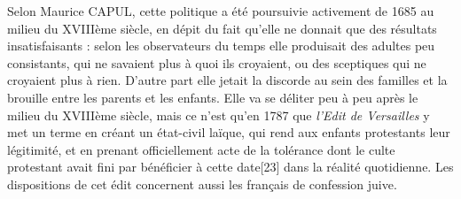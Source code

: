  Selon Maurice CAPUL, cette politique a été poursuivie activement de 1685 au milieu du XVIIIème siècle, en dépit du fait qu'elle ne donnait que des résultats insatisfaisants : selon les observateurs du temps elle produisait des adultes peu consistants, qui ne savaient plus à quoi ils croyaient, ou des sceptiques qui ne croyaient plus à rien. D'autre part elle jetait la discorde au sein des familles et la brouille entre les parents et les enfants. Elle va se déliter peu à peu après le milieu du XVIIIème siècle, mais ce n'est qu'en 1787 que \emph{l'Edit de Versailles} y met un terme en créant un état-civil laïque, qui rend aux enfants protestants leur légitimité, et en prenant officiellement acte de la tolérance dont le culte protestant avait fini par bénéficier à cette date[23] dans la réalité quotidienne. Les dispositions de cet édit concernent aussi les français de confession juive. 
 
